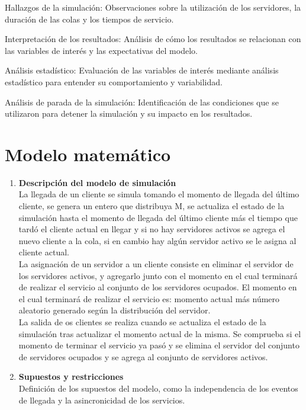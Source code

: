 \documentclass[article]{amsart}
\begin{document}
    Hallazgos de la simulación: Observaciones sobre la utilización de los servidores, la duración de las colas y los tiempos de servicio.

    Interpretación de los resultados: Análisis de cómo los resultados se relacionan con las variables de interés y las expectativas del modelo.

    Análisis estadístico: Evaluación de las variables de interés mediante análisis estadístico para entender su comportamiento y variabilidad.

    Análisis de parada de la simulación: Identificación de las condiciones que se utilizaron para detener la simulación y su impacto en los resultados.

\newpage
\section{Modelo matem\'atico}

\begin{enumerate}
\item \textbf{Descripción del modelo de simulación}\\
    La llegada de un cliente se simula tomando el momento de llegada del \'ultimo cliente, se genera un entero que distribuya M, se actualiza el estado de la simulaci\'on hasta el momento de llegada del \'ultimo cliente m\'as el tiempo que tard\'o el cliente actual en llegar y si no hay servidores activos se agrega el nuevo cliente a la cola, si en cambio hay alg\'un servidor activo se le asigna al cliente actual.\\
    La asignaci\'on de un servidor a un cliente consiste en eliminar el servidor de los servidores activos, y agregarlo junto con el momento en el cual terminar\'a de realizar el servicio al conjunto de los servidores ocupados. El momento en el cual terminar\'a de realizar el servicio es: momento actual m\'as n\'umero aleatorio generado seg\'un la distribuci\'on del servidor.\\
    La salida de os clientes se realiza cuando se actualiza el estado de la simulaci\'on tras actualizar el momento actual de la misma. Se comprueba si el momento de terminar el servicio ya pas\'o y se elimina el servidor del conjunto de servidores ocupados y se agrega al conjunto de servidores activos.\\

\item \textbf{Supuestos y restricciones}\\
Definición de los supuestos del modelo, como la independencia de los eventos de llegada y la asincronicidad de los servicios.


\end{enumerate}
\end{document}
